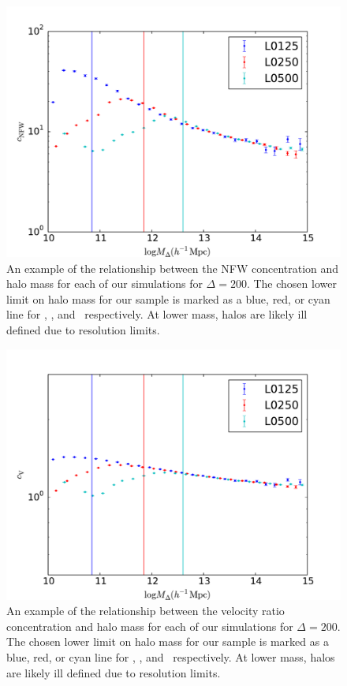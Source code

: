 \documentclass[usenatbib,usegraphicx,letterpaper]{mn2e}
\begin{document}
\begin{figure}
\centering
\includegraphics[width=.5\textwidth]{masscut_cnfw_d200.pdf}
\caption{An example of the relationship between the NFW concentration and halo mass for each of our simulations for $\Delta =200$. The chosen lower limit on halo mass for our sample is marked as a blue, red, or cyan line for \simA, \simB, and \simC \ respectively. At lower mass, halos are likely ill defined due to resolution limits.  }
\label{fig:cnfwrelation}
\end{figure}


\begin{figure}
\centering
\includegraphics[width=.5\textwidth]{masscut_cV_d200.pdf}
\caption{An example of the relationship between the velocity ratio concentration and halo mass for each of our simulations for $\Delta =200$. The chosen lower limit on halo mass for our sample is marked as a blue, red, or cyan line for \simA, \simB, and \simC \ respectively. At lower mass, halos are likely ill defined due to resolution limits.}
\label{fig:cvrelation}
\end{figure}
\end{document}

